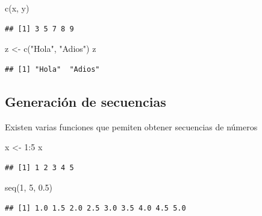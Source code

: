 \documentclass[
]{book}
\newenvironment{Shaded}{\begin{snugshade}}{\end{snugshade}}
\newcommand{\DecValTok}[1]{\textcolor[rgb]{0.00,0.00,0.81}{#1}}
\newcommand{\FloatTok}[1]{\textcolor[rgb]{0.00,0.00,0.81}{#1}}
\newcommand{\FunctionTok}[1]{\textcolor[rgb]{0.00,0.00,0.00}{#1}}
\newcommand{\NormalTok}[1]{#1}
\newcommand{\OtherTok}[1]{\textcolor[rgb]{0.56,0.35,0.01}{#1}}
\newcommand{\SpecialCharTok}[1]{\textcolor[rgb]{0.00,0.00,0.00}{#1}}
\newcommand{\StringTok}[1]{\textcolor[rgb]{0.31,0.60,0.02}{#1}}
\theoremstyle{break}
\theoremstyle{nonumberplain}
\begin{document}
\begin{Shaded}
\begin{Highlighting}[]
\FunctionTok{c}\NormalTok{(x, y)}
\end{Highlighting}
\end{Shaded}

\begin{verbatim}
## [1] 3 5 7 8 9
\end{verbatim}

\begin{Shaded}
\begin{Highlighting}[]
\NormalTok{z }\OtherTok{\textless{}{-}} \FunctionTok{c}\NormalTok{(}\StringTok{"Hola"}\NormalTok{, }\StringTok{"Adios"}\NormalTok{)}
\NormalTok{z}
\end{Highlighting}
\end{Shaded}

\begin{verbatim}
## [1] "Hola"  "Adios"
\end{verbatim}

\hypertarget{generaciuxf3n-de-secuencias}{%
\subsection{Generación de secuencias}\label{generaciuxf3n-de-secuencias}}

Existen varias funciones que pemiten obtener secuencias de números

\begin{Shaded}
\begin{Highlighting}[]
\NormalTok{x }\OtherTok{\textless{}{-}} \DecValTok{1}\SpecialCharTok{:}\DecValTok{5}
\NormalTok{x}
\end{Highlighting}
\end{Shaded}

\begin{verbatim}
## [1] 1 2 3 4 5
\end{verbatim}

\begin{Shaded}
\begin{Highlighting}[]
\FunctionTok{seq}\NormalTok{(}\DecValTok{1}\NormalTok{, }\DecValTok{5}\NormalTok{, }\FloatTok{0.5}\NormalTok{)}
\end{Highlighting}
\end{Shaded}

\begin{verbatim}
## [1] 1.0 1.5 2.0 2.5 3.0 3.5 4.0 4.5 5.0
\end{verbatim}
\end{document}
